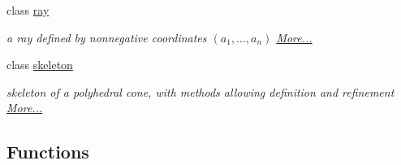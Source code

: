 \begin{DoxyCompactItemize}
class \hyperlink{group___c_l_s_solvers_classray}{ray}
\begin{DoxyCompactList}\small\item\em a ray defined by nonnegative coordinates $(a_1,\ldots,a_n)$  \hyperlink{group___c_l_s_solvers_classray}{More...}\end{DoxyCompactList}\item 
class \hyperlink{group___c_l_s_solvers_classskeleton}{skeleton}
\begin{DoxyCompactList}\small\item\em skeleton of a polyhedral cone, with methods allowing definition and refinement  \hyperlink{group___c_l_s_solvers_classskeleton}{More...}\end{DoxyCompactList}\end{DoxyCompactItemize}
\subsection*{Functions}
